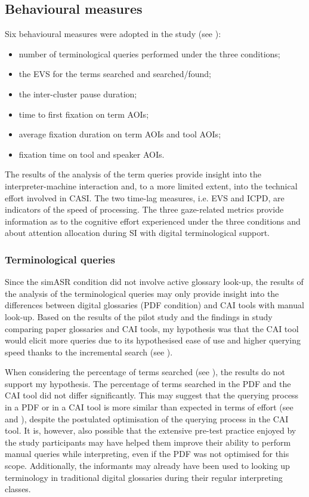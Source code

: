 \subsection{Behavioural measures} \label{behaviouraldisc}
Six behavioural measures were adopted in the study (see ):

\begin{itemize}
    \item number of terminological queries performed under the three conditions;
    \item the EVS for the terms searched and searched/found;
    \item the inter-cluster pause duration;
    \item time to first fixation on term AOIs;
    \item average fixation duration on term AOIs and tool AOIs;
    \item fixation time on tool and speaker AOIs.
\end{itemize}

The results of the analysis of the term queries provide insight into the in\-ter\-pret\-er-ma\-chine interaction and, to a more limited extent, into the technical effort involved in CASI. The two time-lag measures, i.e. EVS and ICPD, are indicators of the speed of processing. The three gaze-related metrics provide information as to the cognitive effort experienced under the three conditions and about attention allocation during SI with digital terminological support.

\subsubsection{Terminological queries} \label{queriesdisc}
Since the simASR condition did not involve active glossary look-up, the results of the analysis of the terminological queries may only provide insight into the differences between digital glossaries (PDF condition) and CAI tools with manual look-up. Based on the results of the pilot study and the findings in  study comparing paper glossaries and CAI tools, my hypothesis was that the CAI tool would elicit more queries due to its hypothesised ease of use and higher querying speed thanks to the incremental search (see ).

When considering the percentage of terms searched (see ), the results do not support my hypothesis. The percentage of terms searched in the PDF and the CAI tool did not differ significantly. This may suggest that the querying process in a PDF or in a CAI tool is more similar than expected in terms of effort (see  and ), despite the postulated optimisation of the querying process in the CAI tool. It is, however, also possible that the extensive pre-test practice enjoyed by the study participants may have helped them improve their ability to perform manual queries while interpreting, even if the PDF was not optimised for this scope. Additionally, the informants may already have been used to looking up terminology in traditional digital glossaries during their regular interpreting classes.

